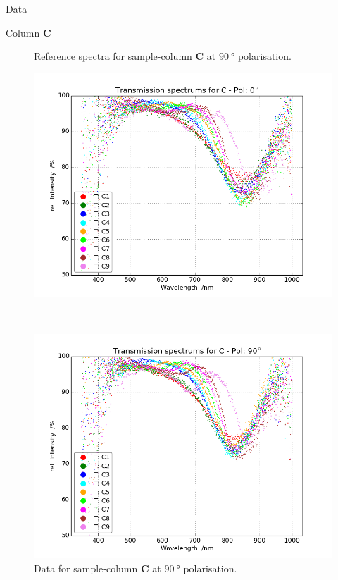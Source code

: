 \begin{appendix}
\begin{chapter}{Data}
\begin{section}{Column \textbf{C}}
\begin{figure}[ht!]
\begin{minipage}{.92\textwidth}
          \caption{Reference spectra for sample-column \textbf{C} at
              $\SI{90}{\degree}$ polarisation.}
          \label{fig:Refspec_CPol90}
        \end{minipage}
      \end{figure}
      \newpage
      \begin{figure}[ht!]
        \centering
        \begin{minipage}{.92\textwidth}
          \centering
          \includegraphics[width=\textwidth]{Figures/TransspecRAW_CPol0.png}
          \caption{Data for sample-column \textbf{C} at $\SI{0}{\degree}$
              polarisation.}
          \label{fig:TransspecRAW_CPol0}
        \end{minipage}\\
        \begin{minipage}{.92\textwidth}
          \centering
          \includegraphics[width=\textwidth]{Figures/TransspecRAW_CPol90.png}
          \caption{Data for sample-column \textbf{C} at $\SI{90}{\degree}$
              polarisation.}
          \label{fig:TransspecRAW_CPol90}
        \end{minipage}
      \end{figure}
      

\end{section}
\end{chapter}
\end{appendix}
